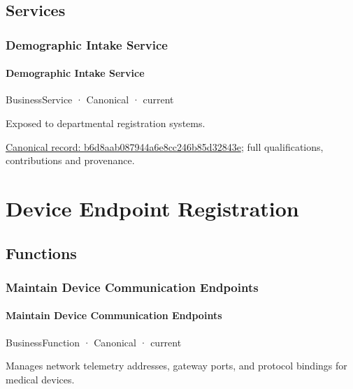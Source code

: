 \subsection{Services}

\subsubsection{Demographic Intake Service}

\paragraph{Demographic Intake Service}

\label{element:b6d8aab087944a6e8cc246b85d32843e}
{\small BusinessService · Canonical · current}\par

Exposed to departmental registration systems.


{\footnotesize \href{../../../../continuum/business/business-service/b6d8aab087944a6e8cc246b85d32843e.md}{Canonical record: b6d8aab087944a6e8cc246b85d32843e}; full qualifications, contributions and provenance.}\par
\section{Device Endpoint Registration}

\subsection{Functions}

\subsubsection{Maintain Device Communication Endpoints}

\paragraph{Maintain Device Communication Endpoints}

\label{element:ab5a7538fbd449ae8214d584b7d53a43}
{\small BusinessFunction · Canonical · current}\par

Manages network telemetry addresses, gateway ports, and protocol bindings for medical devices.


